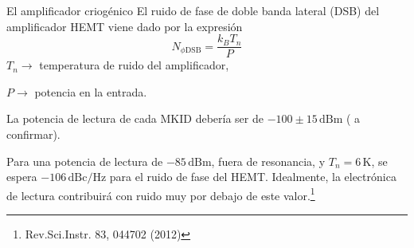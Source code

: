 \documentclass[ignorenonframetext,12pt]{beamer}
\begin{document}
\begin{frame}{El amplificador criogénico}
				El ruido de fase de doble banda lateral (DSB) del amplificador HEMT
												viene dado por la expresión
												{\color{red}
												\begin{equation*}
																N_{\phi \text{DSB}} = \frac{k_B T_n}{P}
												\end{equation*}} 
												\flushleft
												$T_n \to$ temperatura de ruido del amplificador, 

												$P \to$ potencia en la entrada. 

												La potencia de lectura de cada MKID debería ser de $-100 \pm
												15\,\text{dBm}$ ({\color{red} a confirmar}). 

												Para una potencia de lectura de $-85\,\text{dBm}$, fuera
												de resonancia, y $T_n = 6\,\text{K}$, se espera
												$-106\,\text{dBc/Hz}$ para el ruido de fase del HEMT.
												Idealmente, la electrónica de lectura contribuirá con
												ruido muy por debajo de este
												valor.\footnote{Rev.Sci.Instr. 83, 044702 (2012)}
\end{frame}
\end{document}
